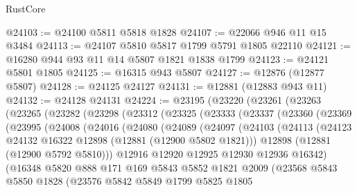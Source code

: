 \begin{lexlean}{RustCore}
\begin{coremodule}
@24103 := @24100 @5811 @5818 @1828
@24107 := @22066 @946 @11 @15 @3484
@24113 := @24107 @5810 @5817 @1799 @5791 @1805 @22110
@24121 := @16280 @944 @93 @11 @14 @5807 @1821 @1838 @1799
@24123 := @24121 @5801 @1805
@24125 := @16315 @943 @5807
@24127 := @12876 (@12877 @5807)
@24128 := @24125 @24127
@24131 := @12881 (@12883 @943 @11)
@24132 := @24128 @24131
@24224 := @23195
    (@23220
      (@23261
        (@23263
          (@23265
            (@23282
              (@23298
                (@23312
                  (@23325
                    (@23333
                      (@23337
                        (@23360
                          (@23369
                            (@23995
                              (@24008
                                (@24016
                                  (@24080
                                    (@24089
                                      (@24097
                                        (@24103
                                          (@24113
                                            (@24123
                                              @24132
                                              @16322
                                              @12898
                                              (@12881 (@12900 @5802 @1821)))
                                            @12898
                                            (@12881 (@12900 @5792 @5810)))
                                          @12916
                                          @12920
                                          @12925
                                          @12930
                                          @12936
                                          @16342)
                                        (@16348
                                          @5820
                                          @888
                                          @171
                                          @169
                                          @5843
                                          @5852
                                          @1821
                                          @2009
                                          (@23568
                                            @5843
                                            @5850
                                            @1828
                                            (@23576
                                              @5842
                                              @5849
                                              @1799
                                              @5825
                                              @1805

\end{coremodule}
\end{lexlean}
